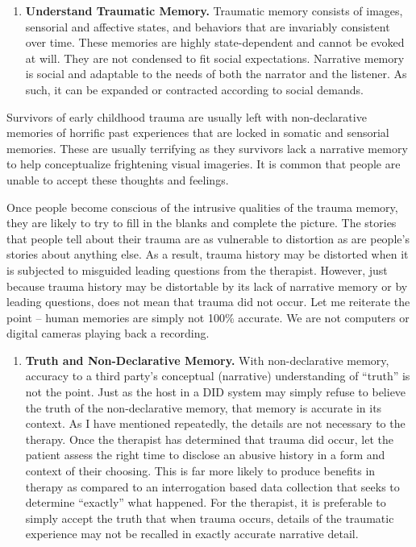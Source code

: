 \documentclass[]{book}
\providecommand{\tightlist}{%
  \setlength{\itemsep}{0pt}\setlength{\parskip}{0pt}}
\begin{document}
\begin{enumerate}
\item
  \textbf{Understand Traumatic Memory.} Traumatic memory consists of images, sensorial and affective states, and behaviors that are invariably consistent over time. These memories are highly state-dependent and cannot be evoked at will. They are not condensed to fit social expectations. Narrative memory is social and adaptable to the needs of both the narrator and the listener. As such, it can be expanded or contracted according to social demands.
\end{enumerate}

Survivors of early childhood trauma are usually left with non-declarative memories of horrific past experiences that are locked in somatic and sensorial memories. These are usually terrifying as they survivors lack a narrative memory to help conceptualize frightening visual imageries. It is common that people are unable to accept these thoughts and feelings.

Once people become conscious of the intrusive qualities of the trauma memory, they are likely to try to fill in the blanks and complete the picture. The stories that people tell about their trauma are as vulnerable to distortion as are people's stories about anything else. As a result, trauma history may be distorted when it is subjected to misguided leading questions from the therapist. However, just because trauma history may be distortable by its lack of narrative memory or by leading questions, does not mean that trauma did not occur. Let me reiterate the point -- human memories are simply not 100\% accurate. We are not computers or digital cameras playing back a recording.

\begin{enumerate}
\def\labelenumi{\arabic{enumi}.}
\setcounter{enumi}{5}
\tightlist
\item
  \textbf{Truth and Non-Declarative Memory.} With non-declarative memory, accuracy to a third party's conceptual (narrative) understanding of ``truth'' is not the point. Just as the host in a DID system may simply refuse to believe the truth of the non-declarative memory, that memory is accurate in its context. As I have mentioned repeatedly, the details are not necessary to the therapy. Once the therapist has determined that trauma did occur, let the patient assess the right time to disclose an abusive history in a form and context of their choosing. This is far more likely to produce benefits in therapy as compared to an interrogation based data collection that seeks to determine ``exactly'' what happened. For the therapist, it is preferable to simply accept the truth that when trauma occurs, details of the traumatic experience may not be recalled in exactly accurate narrative detail.
\end{enumerate}
\end{document}
